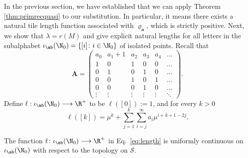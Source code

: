 In the previous section, we have established that we can apply Theorem \ref{thm:primrecquasi} to our substitution.
In particular, it means there exists a natural tile length function associated with $\varrho^{ }_{\mathbf{a}}$, which is strictly positive.
Next, we show that $\lambda=r(M)$ and give explicit natural lengths for all letters in the subalphabet $\iota_{\ab}(\N_0)=\left\{[i]\colon i\in \N_0\right\}$ of isolated points. Recall that
$$\mathbf A=\left( 
\begin{array}{cccccc}
a_0& a_1+1& a_2 & a_3 & a_4 & \dots\\
1 & 0 & 1 & 0 & 0 & \ldots\\
0 & 1 & 0 & 1 & 0 & \ldots\\
0 & 0 & 1 & 0 & 1 & \ldots\\
0 & 0 & 0 & 1 & 0 & \ldots\\
\vdots & \vdots & \vdots & \vdots & \vdots & \ddots
\end{array}
\right).$$
Define $\ell:\iota_{\ab}(\N_0)\longrightarrow \R^+$ to be $\ell([0]):=1$, and for every $k>0$
\begin{equation}\label{eq:length}
\ell([k])=\mu^k+\sum_{j=1}^k\sum_{i=j}^\infty a_i\mu^{i+k+1-2j}.
\end{equation}


\begin{lem}\label{lem:unifcon}
The function $\ell\/\colon\/\iota_{\ab}(\N_0)\longrightarrow \R^+$ in Eq.~\eqref{eq:length} is uniformly continuous on\/ $\iota_{\ab}(\N_0)$ with respect to the topology on\/ $\mathcal{S}$.
\end{lem}

